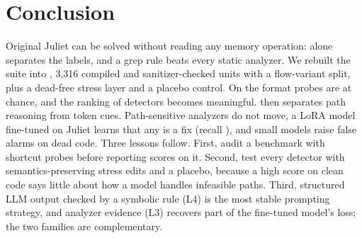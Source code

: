 \section{Conclusion}
\label{sec:conclusion}

Original Juliet \cwe{} can be solved without reading any memory operation:  alone separates the labels, and a grep rule beats every static analyzer.
We rebuilt the suite into \Deb, 3,316 compiled and sanitizer-checked units with a flow-variant split, plus a dead-free stress layer and a placebo control.
On \Deb{} the format probes are at chance, and the ranking of detectors becomes meaningful.
\Dead{} then separates path reasoning from token cues.
Path-sensitive analyzers do not move, a LoRA model fine-tuned on Juliet learns that any  is a fix (recall ), and small models raise false alarms on dead code.
Three lessons follow.
First, audit a benchmark with shortcut probes before reporting scores on it.
Second, test every detector with semantics-preserving stress edits and a placebo, because a high score on clean code says little about how a model handles infeasible paths.
Third, structured LLM output checked by a symbolic rule (L4) is the most stable prompting strategy, and analyzer evidence (L3) recovers part of the fine-tuned model's loss; the two families are complementary.

